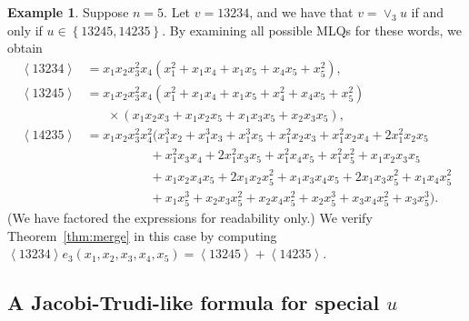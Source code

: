 \documentclass[reqno]{amsart}
\newcommand{\0}{\phantom{c}}
\newcommand{\swt}[1]{\left\langle #1 \right\rangle} %
\newcommand{\merge}[1]{\vee_{#1}} %
\newcommand{\set}[1]{\left\{ #1 \right\}}
\theoremstyle{plain}
\theoremstyle{definition}
\newtheorem{example}[thm]{Example}
\numberwithin{equation}{section}
\begin{document}
\begin{example}
Suppose $n = 5$.
Let $v = 13234$, and we have that $v = \merge{3} u$ if and only if $u \in \set{13245, 14235}$.
By examining all possible MLQs for these words, we obtain
\begin{align*}
\swt{13234} & = x_1 x_2 x_3^2 x_4 (x_1^2 + x_1 x_4 + x_1 x_5 + x_4 x_5 + x_5^2),
\\ \swt{13245} & = x_1 x_2 x_3^2 x_4 (x_1^2 + x_1x_4 + x_1x_5 + x_4^2 + x_4x_5 + x_5^2)
\\ & \hspace{20pt} \times (x_1x_2x_3 + x_1x_2x_5+x_1x_3x_5+x_2x_3x_5),
\\ \swt{14235} & = x_1x_2x_3^2x_4^2 (x_1^3x_2 + x_1^3x_3 + x_1^3x_5 + x_1^2x_2x_3 + x_1^2x_2x_4 + 2x_1^2x_2x_5
\\ & \hspace{60pt} + x_1^2x_3x_4 + 2x_1^2x_3x_5 + x_1^2x_4x_5 + x_1^2x_5^2 + x_1x_2x_3x_5
\\ & \hspace{60pt} + x_1x_2x_4x_5 + 2x_1x_2x_5^2 + x_1x_3x_4x_5 + 2x_1x_3x_5^2 + x_1x_4x_5^2
\\ & \hspace{60pt} + x_1x_5^3 + x_2x_3x_5^2 + x_2x_4x_5^2 + x_2x_5^3 + x_3x_4x_5^2 + x_3x_5^3).
\end{align*}
(We have factored the expressions for readability only.)
We verify Theorem~\ref{thm:merge} in this case by computing $\swt{13234} e_3(x_1, x_2, x_3, x_4, x_5) = \swt{13245} + \swt{14235}$.
\end{example}

\subsection{A Jacobi-Trudi-like formula for special $u$}
\label{subsec:JT_formula}
\end{document}
